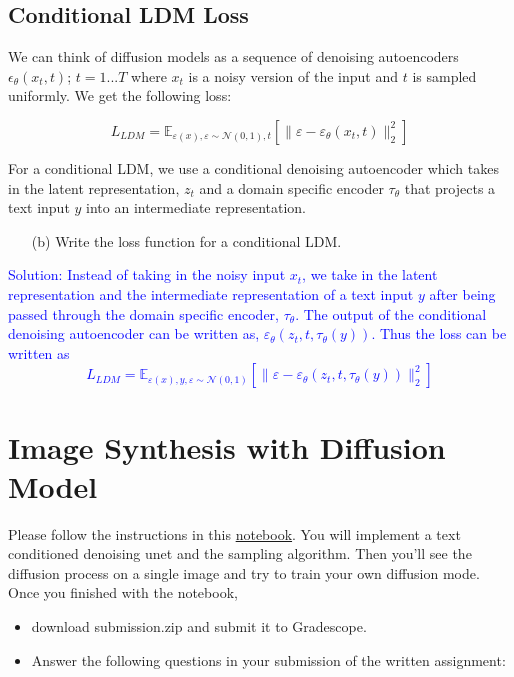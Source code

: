 \documentclass[a4paper]{article}
\begin{document}
\subsection{Conditional LDM Loss}
We can think of diffusion models as a sequence of denoising autoencoders \(\epsilon_{\theta}(x_t, t)\); \(t = 1...T\) where \(x_t\) is a noisy version of the input and  \(t\) is sampled uniformly. We get the following loss:

\[L_{LDM} = \mathbb{E}_{\varepsilon(x), \varepsilon \sim \mathcal{N}(0, 1), t} [\| \varepsilon - \varepsilon_{\theta}(x_t, t) \|_2^2 ] \]

For a conditional LDM, we use a conditional denoising autoencoder which takes in the latent representation, \(z_t\) and a domain specific encoder \(\tau_{\theta}\) that projects a text input \(y\) into an intermediate representation. 
\begin{itemize}
    \item [(b)]
    Write the loss function for a conditional LDM.
   
\end{itemize}
 \textcolor{blue}{Solution: Instead of taking in the noisy input \(x_t\), we take in the latent representation and the intermediate representation of a text input \(y\) after being passed through the domain specific encoder, \(\tau_{\theta}\). 
 The output of the conditional denoising autoencoder can be written as, 
 \(\varepsilon_{\theta}(z_t, t, \tau_{\theta}(y))\). Thus the loss can be written as
 \[L_{LDM} = \mathbb{E}_{\varepsilon(x), y, \varepsilon \sim \mathcal{N}(0, 1)} [\| \varepsilon - \varepsilon_{\theta}(z_t, t, \tau_{\theta}(y)) \|_2^2] \] }


\section{Image Synthesis with Diffusion Model}

Please follow the instructions in this \href{https://colab.research.google.com/drive/1mmyvwlYvAnnfIBIr29bMvOEnL2mUcPHm?usp=sharing}{notebook}. 
You will implement a text conditioned denoising unet and the sampling algorithm. Then you'll see the diffusion process on a single image and try to train your own diffusion mode. Once you finished with the notebook,
\begin{itemize}
    \item download submission.zip and submit it to Gradescope.

    \item Answer the following questions in your submission of the written assignment:
\end{itemize}
\end{document}
